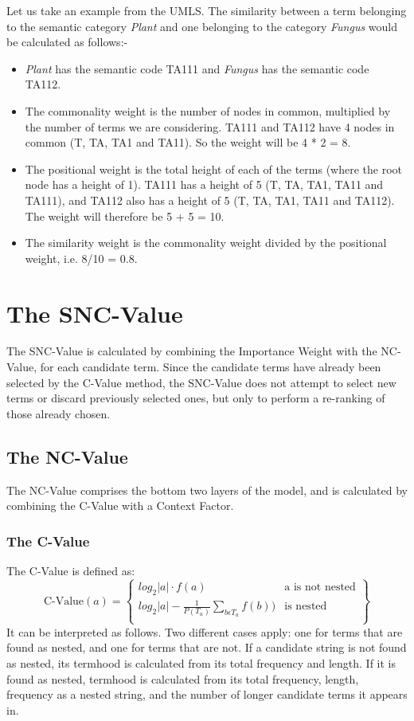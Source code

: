 Let us take an example from the UMLS. The similarity between a term belonging to the semantic
category {\it Plant} and one belonging to the category
{\it Fungus} would be calculated as follows:-
\begin{itemize}
\item {\it Plant} has the semantic code TA111 and {\it Fungus} has the
semantic code TA112.

\item The commonality weight is the number of nodes in common, multiplied by
the number of terms we are considering. TA111 and TA112 have 4 nodes in
common (T, TA, TA1 and TA11). So the weight will be 4 * 2 = 8.

\item The positional weight is the total height of each of the terms (where
the root node has a height of 1). TA111 has a height of 5 (T, TA, TA1,
TA11 and TA111), and TA112 also has a height of 5 (T, TA, TA1, TA11
and TA112). The weight will therefore be 5 + 5 = 10.

\item The similarity weight is the commonality weight divided by the
positional weight, i.e. 8/10 = 0.8.
\end{itemize}
\vspace{\baselineskip}

\section{The SNC-Value}
The SNC-Value is calculated by combining the Importance Weight with
the NC-Value, for each candidate term. Since the candidate terms have
already been selected by the C-Value method, the SNC-Value does not
attempt to select new terms or discard previously selected ones, but
only to perform a re-ranking of those already chosen.

\subsection{The NC-Value}
The NC-Value comprises the bottom two layers of the model, and is
calculated by combining the C-Value with a Context Factor. 
\subsubsection{The C-Value}
The C-Value is defined as:
\begin{displaymath}
\mbox{C-Value}(a) = \left \{
\begin{array}{ll}
log_2|a| \cdot f(a) & \mbox{a is not nested}\\
log_2|a| - \frac{1}{P(T_a)} \sum_{b \epsilon T_a} f(b)) & \mbox{is nested}\\
\end{array}
\right \}
\end{displaymath}
It can be interpreted as follows. Two different cases apply: one for terms that
are found as nested, and one for terms that are not. If a candidate
string is not found as nested, its termhood is calculated from its
total frequency and length. If it is found as nested, termhood is
calculated from its total frequency, length, frequency as a nested
string, and the number of longer candidate terms it appears in.

